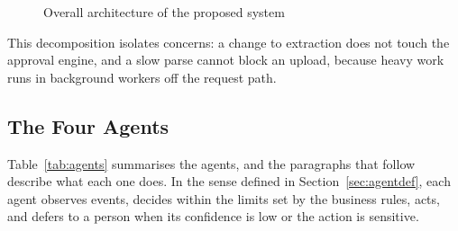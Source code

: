 \begin{figure}[H]
\caption{Overall architecture of the proposed system}\label{fig:arch}
\end{figure}

This decomposition isolates concerns: a change to extraction does not touch the approval engine, and a slow parse cannot block an upload, because heavy work runs in background workers off the request path.

\subsection{The Four Agents}
Table~\ref{tab:agents} summarises the agents, and the paragraphs that follow describe what each one does. In the sense defined in Section~\ref{sec:agentdef}, each agent observes events, decides within the limits set by the business rules, acts, and defers to a person when its confidence is low or the action is sensitive.

